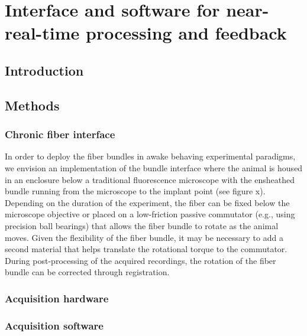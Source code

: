 \chapter{Interface and software for near-real-time processing and feedback}

\label{chapter:processing}
\thispagestyle{myheadings}

\graphicspath{{6_Processing/Figures/}}

\section{Introduction}


\section{Methods}


\subsection{Chronic fiber interface}

In order to deploy the fiber bundles in awake behaving experimental 
paradigms, we envision an implementation of the bundle interface where
 the animal is housed in an enclosure below a traditional fluorescence
 microscope with the ensheathed bundle running from the microscope to 
the implant point (see figure x). Depending on the duration of the 
experiment, the fiber can be fixed below the microscope objective or 
placed on a low-friction passive commutator (e.g., using precision 
ball bearings) that allows the fiber bundle to rotate as the animal 
moves. Given the flexibility of the fiber bundle, it may be necessary 
to add a second material that helps translate the rotational torque to
 the commutator. During post-processing of the acquired recordings, 
the rotation of the fiber bundle can be corrected through 
registration.

\subsection{Acquisition hardware}


\subsection{Acquisition software}

